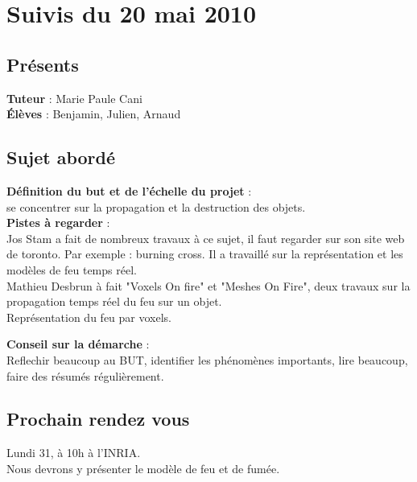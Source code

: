 \documentclass[a4paper,10pt]{article}
\begin{document}
\newpage







\section{Suivis du  20 mai 2010}
\subsection{Présents}
\textbf{Tuteur} : Marie Paule Cani \\
\textbf{Élèves} : Benjamin, Julien, Arnaud \\
\subsection{Sujet abordé}
\textbf{Définition du but et de l'échelle du projet} :  \\
se concentrer sur la propagation et la destruction des objets.\\
\textbf{Pistes à regarder} : \\
Jos Stam a fait de nombreux travaux à ce sujet, il faut regarder sur son site web de toronto. Par exemple : burning cross. Il a travaillé sur la représentation et  les modèles de feu temps réel.\\
Mathieu Desbrun à fait "Voxels On fire" et "Meshes On Fire", deux travaux sur la propagation temps réel du feu sur un objet.\\
Représentation du feu par voxels.


\textbf{Conseil sur la démarche} : \\
Reflechir beaucoup au BUT,
identifier les phénomènes importants,
lire beaucoup,
faire des résumés régulièrement.

\subsection{Prochain rendez vous}
Lundi 31, à 10h à l'INRIA.\\
Nous devrons y présenter le modèle de feu et de fumée.
\end{document}

